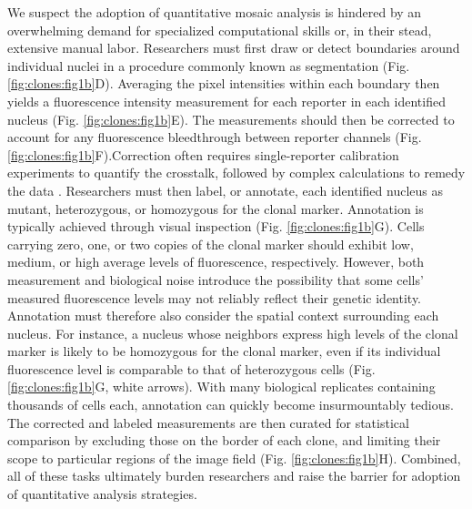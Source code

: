 We suspect the adoption of quantitative mosaic analysis is hindered by an overwhelming demand for specialized computational skills or, in their stead, extensive manual labor. Researchers must first draw or detect boundaries around individual nuclei in a procedure commonly known as segmentation (Fig. \ref{fig:clones:fig1b}D). Averaging the pixel intensities within each boundary then yields a fluorescence intensity measurement for each reporter in each identified nucleus (Fig. \ref{fig:clones:fig1b}E). The measurements should then be corrected to account for any fluorescence bleedthrough between reporter channels (Fig. \ref{fig:clones:fig1b}F).Correction often requires single-reporter calibration experiments to quantify the crosstalk, followed by complex calculations to remedy the data \cite{Bacia2012,Elangovan2003}. Researchers must then label, or annotate, each identified nucleus as mutant, heterozygous, or homozygous for the clonal marker. Annotation is typically achieved through visual inspection (Fig. \ref{fig:clones:fig1b}G). Cells carrying zero, one, or two copies of the clonal marker should exhibit low, medium, or high average levels of fluorescence, respectively. However, both measurement and biological noise introduce the possibility that some cells’ measured fluorescence levels may not reliably reflect their genetic identity. Annotation must therefore also consider the spatial context surrounding each nucleus. For instance, a nucleus whose neighbors express high levels of the clonal marker is likely to be homozygous for the clonal marker, even if its individual fluorescence level is comparable to that of heterozygous cells (Fig. \ref{fig:clones:fig1b}G, white arrows). With many biological replicates containing thousands of cells each, annotation can quickly become insurmountably tedious. The corrected and labeled measurements are then curated for statistical comparison by excluding those on the border of each clone, and limiting their scope to particular regions of the image field (Fig. \ref{fig:clones:fig1b}H). Combined, all of these tasks ultimately burden researchers and raise the barrier for adoption of quantitative analysis strategies. 

